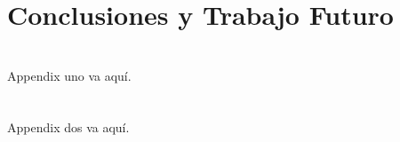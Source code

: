 \documentclass{wsdcr}
\begin{document}
\section{Conclusiones y Trabajo Futuro}







\appendices
\section{}
Appendix uno va aquí.

\section{}
Appendix dos va aquí.




\end{document}
